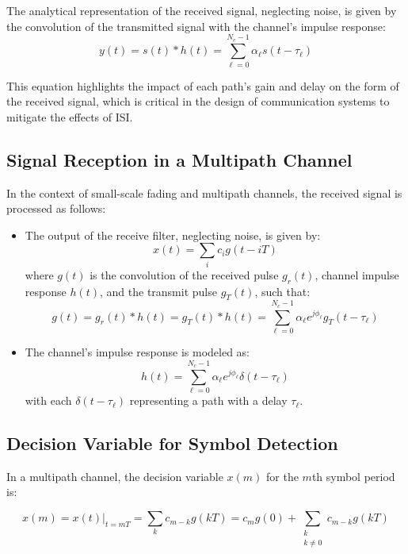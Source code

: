 The analytical representation of the received signal, neglecting noise, is given by the convolution of the transmitted signal with the channel's impulse response:
\begin{equation}
    y(t) = s(t) \ast h(t) = \sum_{\ell=0}^{N_c-1} \alpha_{\ell} s(t - \tau_{\ell})
\end{equation}

This equation highlights the impact of each path's gain and delay on the form of the received signal, which is critical in the design of communication systems to mitigate the effects of ISI.


\subsection*{Signal Reception in a Multipath Channel}

In the context of small-scale fading and multipath channels, the received signal is processed as follows:

\begin{itemize}
    \item The output of the receive filter, neglecting noise, is given by:
    \[
    x(t) = \sum_{i} c_i g(t - iT)
    \]
    where \( g(t) \) is the convolution of the received pulse \( g_r(t) \), channel impulse response \( h(t) \), and the transmit pulse \( g_T(t) \), such that:
    \[
    g(t) = g_r(t) \ast h(t) = g_T(t) \ast h(t) = \sum_{\ell=0}^{N_c-1} \alpha_{\ell} e^{j\phi_{\ell}} g_T(t - \tau_{\ell})
    \]
    
    \item The channel's impulse response is modeled as:
    \[
    h(t) = \sum_{\ell=0}^{N_c-1} \alpha_{\ell} e^{j\phi_{\ell}} \delta(t - \tau_{\ell})
    \]
    with each \( \delta(t - \tau_{\ell}) \) representing a path with a delay \( \tau_{\ell} \).
\end{itemize}

\subsection*{Decision Variable for Symbol Detection}

In a multipath channel, the decision variable \( x(m) \) for the \( m \)th symbol period is:

\begin{equation}
    x(m) = x(t) \Big|_{t=mT} = \sum_{k} c_{m-k} g(kT) = c_m g(0) + \sum_{\substack{k \\ k \neq 0}} c_{m-k} g(kT)
\end{equation}


